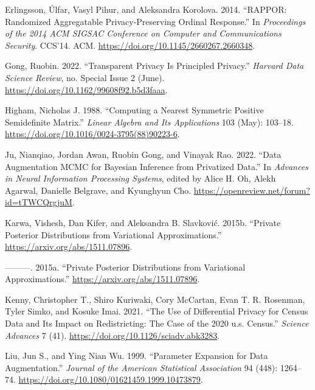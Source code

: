 \begin{CSLReferences}{1}{0}
\leavevmode{}%
Erlingsson, Úlfar, Vasyl Pihur, and Aleksandra Korolova. 2014. {``RAPPOR: Randomized Aggregatable Privacy-Preserving Ordinal Response.''} In \emph{Proceedings of the 2014 ACM SIGSAC Conference on Computer and Communications Security}. CCS'14. ACM. \url{https://doi.org/10.1145/2660267.2660348}.

\leavevmode{}%
Gong, Ruobin. 2022. {``Transparent Privacy Is Principled Privacy.''} \emph{Harvard Data Science Review}, no. Special Issue 2 (June). \url{https://doi.org/10.1162/99608f92.b5d3faaa}.

\leavevmode{}%
Higham, Nicholas J. 1988. {``Computing a Nearest Symmetric Positive Semidefinite Matrix.''} \emph{Linear Algebra and Its Applications} 103 (May): 103--18. \url{https://doi.org/10.1016/0024-3795(88)90223-6}.

\leavevmode{}%
Ju, Nianqiao, Jordan Awan, Ruobin Gong, and Vinayak Rao. 2022. {``Data Augmentation {MCMC} for Bayesian Inference from Privatized Data.''} In \emph{Advances in Neural Information Processing Systems}, edited by Alice H. Oh, Alekh Agarwal, Danielle Belgrave, and Kyunghyun Cho. \url{https://openreview.net/forum?id=tTWCQrgjuM}.

\leavevmode{}%
Karwa, Vishesh, Dan Kifer, and Aleksandra B. Slavković. 2015b. {``Private Posterior Distributions from Variational Approximations.''} \url{https://arxiv.org/abs/1511.07896}.

\leavevmode{}%
---------. 2015a. {``Private Posterior Distributions from Variational Approximations.''} \url{https://arxiv.org/abs/1511.07896}.

\leavevmode{}%
Kenny, Christopher T., Shiro Kuriwaki, Cory McCartan, Evan T. R. Rosenman, Tyler Simko, and Kosuke Imai. 2021. {``The Use of Differential Privacy for Census Data and Its Impact on Redistricting: The Case of the 2020 u.s. Census.''} \emph{Science Advances} 7 (41). \url{https://doi.org/10.1126/sciadv.abk3283}.

\leavevmode{}%
Liu, Jun S., and Ying Nian Wu. 1999. {``Parameter Expansion for Data Augmentation.''} \emph{Journal of the American Statistical Association} 94 (448): 1264--74. \url{https://doi.org/10.1080/01621459.1999.10473879}.


\end{CSLReferences}
